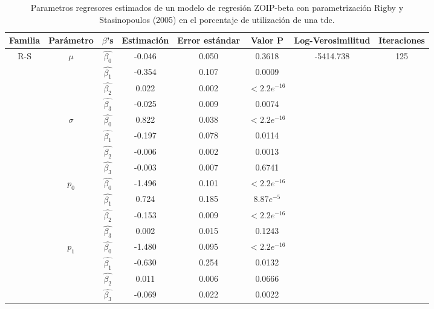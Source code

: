 \begin{table}[!hbt]
{\scriptsize
\begin{center}
\begin{tabular}{|c|c|c|ccc|c|c|}\hline
Familia & Par\'{a}metro & $\beta$'s & Estimaci\'{o}n & Error est\'{a}ndar & Valor P & Log-Verosimilitud & Iteraciones \\ \hline \hline
\multirow{12}{*}{R-S} & \multirow{4}{*}{$\mu$} & $\hat{\beta_0}$ & -0.046	&0.050	&0.3618 & \multirow{12}{*}{-5414.738} & \multirow{12}{*}{125}  \\
& & $\hat{\beta_1}$ & -0.354	&0.107	&0.0009 & &\\
& & $\hat{\beta_2}$ & 0.022	&0.002	&$<2.2e^{-16}$ & & \\
& & $\hat{\beta_3}$ & -0.025	&0.009	&0.0074 & & \\ \cline{2-6}
& \multirow{4}{*}{$\sigma$} & $\hat{\beta_0}$ & 0.822	&0.038	&$<2.2e^{-16}$  & &\\
& & $\hat{\beta_1}$ & -0.197	&0.078	&0.0114  & &\\
& & $\hat{\beta_2}$ & -0.006	&0.002	&0.0013  & &\\
& & $\hat{\beta_3}$ & -0.003	&0.007	&0.6741  & &\\ \cline{2-6}
& \multirow{4}{*}{$p_0$} & $\hat{\beta_0}$ & -1.496	&0.101	&$<2.2e^{-16}$  & &\\
& & $\hat{\beta_1}$ & 0.724	&0.185	&$8.87e^{-5}$  & &\\
& & $\hat{\beta_2}$ & -0.153	&0.009	&$<2.2e^{-16}$  & &\\
& & $\hat{\beta_3}$ & 0.002	&0.015	&0.1243  & &\\ \cline{2-6}
& \multirow{4}{*}{$p_1$} & $\hat{\beta_0}$ &-1.480	&0.095	&$<2.2e^{-16}$  & &\\
& & $\hat{\beta_1}$ & -0.630	&0.254	&0.0132  & &\\
& & $\hat{\beta_2}$ & 0.011	&0.006	&0.0666  & &\\
& & $\hat{\beta_3}$ & -0.069	&0.022	&0.0022  & &\\ \hline

\end{tabular}
\caption{Parametros regresores estimados de un modelo de regresi\'{o}n ZOIP-beta con parametrizaci\'{o}n Rigby y Stasinopoulos (2005) en el porcentaje de utilizaci\'{o}n de una tdc.}
\label{T_Apli_CC_RS}
\end{center}
}
\end{table}


